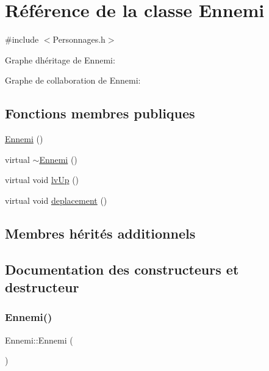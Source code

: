 \hypertarget{classEnnemi}{}\section{Référence de la classe Ennemi}
\label{classEnnemi}


{\ttfamily \#include $<$Personnages.\+h$>$}



Graphe d\textquotesingle{}héritage de Ennemi\+:


Graphe de collaboration de Ennemi\+:
\subsection*{Fonctions membres publiques}
\begin{DoxyCompactItemize}
\item 
\hyperlink{classEnnemi_a9c5eb7ca82848b97f3dcf262fe625b3a}{Ennemi} ()
\item 
virtual \hyperlink{classEnnemi_a7ff128e6df0266cdbc66410e4528a079}{$\sim$\+Ennemi} ()
\item 
virtual void \hyperlink{classEnnemi_a36d244231657f4901ed23a7046f614a1}{lv\+Up} ()
\item 
virtual void \hyperlink{classEnnemi_a6d60d6fed98ea6fe501484a693d163a9}{deplacement} ()
\end{DoxyCompactItemize}
\subsection*{Membres hérités additionnels}


\subsection{Documentation des constructeurs et destructeur}
\mbox{\label{classEnnemi_a9c5eb7ca82848b97f3dcf262fe625b3a}} 
\subsubsection{\texorpdfstring{Ennemi()}{Ennemi()}}
{\footnotesize\ttfamily Ennemi\+::\+Ennemi (\begin{DoxyParamCaption}{ }\end{DoxyParamCaption})}

\mbox{\label{classEnnemi_a7ff128e6df0266cdbc66410e4528a079}} 
